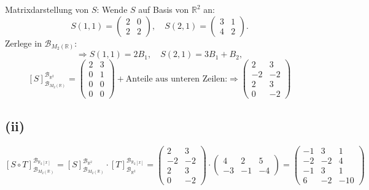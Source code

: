 \documentclass{article}
\begin{document}
Matrixdarstellung von \(S\): Wende \(S\) auf Basis von \(\mathbb{R}^2\) an:
\[
S(1,1) = \begin{pmatrix}2&0\\2&2\end{pmatrix}, \quad
S(2,1) = \begin{pmatrix}3&1\\4&2\end{pmatrix}.
\]
Zerlege in \(\mathcal{B}_{M_2(\mathbb{R})}\):
\[
\Rightarrow S(1,1) = 2 B_1,\quad S(2,1) = 3 B_1 + B_2,
\]
\[
[S]_{\mathcal{B}_{M_2(\mathbb{R})}}^{\mathcal{B}_{\mathbb{R}^2}} =
\begin{pmatrix}
2 & 3 \\
0 & 1 \\
0 & 0 \\
0 & 0
\end{pmatrix}
+ \text{Anteile aus unteren Zeilen:}
\Rightarrow
\begin{pmatrix}
2 & 3 \\
-2 & -2 \\
2 & 3 \\
0 & -2
\end{pmatrix}
\]

\subsection*{(ii)}

\[
[S \circ T]_{\mathcal{B}_{M_2(\mathbb{R})}}^{\mathcal{B}_{\mathbb{R}_2[x]}} = 
[S]^{\mathcal{B}_{\mathbb{R}^2}}_{\mathcal{B}_{M_2(\mathbb{R})}} \cdot
[T]_{\mathcal{B}_{\mathbb{R}^2}}^{\mathcal{B}_{\mathbb{R}_2[x]}} =
\begin{pmatrix}
2 & 3 \\
-2 & -2 \\
2 & 3 \\
0 & -2
\end{pmatrix}
\cdot
\begin{pmatrix}
4 & 2 & 5 \\
-3 & -1 & -4
\end{pmatrix}
=
\begin{pmatrix}
-1 & 3 & 1 \\
-2 & -2 & 4 \\
-1 & 3 & 1 \\
6 & -2 & -10
\end{pmatrix}
\]
\end{document}
